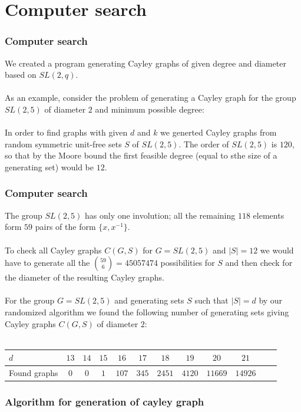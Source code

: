 \documentclass{beamer}
\begin{document}
\section{Computer search} 
\begin{frame}
	\frametitle{Computer search}
	We created a program generating Cayley graphs of given degree and diameter based on $SL(2,q)$. \\~\\
	As an example, consider the problem of generating a Cayley graph for the group $SL(2,5)$ of diameter $2$ and minimum possible degree: \\~\\

	In order to find graphs with given $d$ and $k$ we generted Cayley graphs from random symmetric unit-free sets $S$ of $SL(2,5)$.
	The order of $SL(2,5)$ is $120$, so that by the Moore bound the first feasible degree (equal to sthe size of a generating set) would be $12$.
\end{frame}
\begin{frame}
	\frametitle{Computer search}
	 The group $SL(2,5)$ has only one involution; all the remaining $118$ elements form $59$ pairs of the form $\{x,x^{-1}\}$. \\~\\
	 To check all Cayley graphs $C(G,S)$ for $G=SL(2,5)$ and $|S|=12$ we would have to generate all the ${59 \choose 6} = 45057474$ possibilities for $S$ and then check for the diameter of the resulting Cayley graphs. \\~\\
	For the group $G=SL(2,5)$ and generating sets $S$ such that $|S|=d$ by our randomized algorithm we found the following number of generating sets giving Cayley graphs $C(G,S)$ of diameter $2$: \\~\\
	\begin{tabular}[htbp]{l*{10}{c}r}
		$d$ & $13$ & $14$ & $15$ & $16$ & $17$ & $18$ & $19$ & $20$ & $21$ \\
		\hline
 		Found graphs & $0$  & $0$ & $1$ & $107$ & $345$ & $2451$  & $4120$ & $11669$ & $14926$ \\
	\end{tabular} 
\end{frame}
\begin{frame}
	\frametitle{Algorithm for generation of cayley graph}
	
\end{frame}
\end{document}
